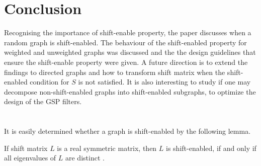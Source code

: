 \documentclass[journal]{IEEEtran}
\begin{document}
\section{Conclusion}
\label{sec:discussion}
Recognising the importance of shift-enable property, the paper discusses when a random graph is shift-enabled. The behaviour of the shift-enabled property for weighted and unweighted graphs was discussed and the the design guidelines that ensure the shift-enable property were given. 
A future direction is to extend the findings to directed graphs and how to transform shift matrix when the shift-enabled condition for $S$ is not satisfied.
It is also interesting to study if one may decompose non-shift-enabled graphs into shift-enabled subgraphs, to optimize the design of the GSP filters.

\appendices


\section{}
It is easily determined whether a graph is shift-enabled by the following lemma.

\begin{Lem}{\label{Lem_undirected_shift}}
	If shift matrix $L$ is a real symmetric matrix, then $L$ is shift-enabled, if and only if all eigenvalues of $L$ are distinct {\rm\cite{ortega2018graph,Liyanchen2021}}.
\end{Lem}
\end{document}
